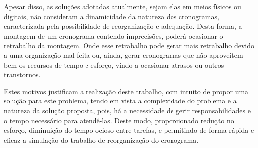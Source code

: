 \par Apesar disso, as soluções adotadas atualmente, sejam elas em meios físicos ou digitais, não consideram a dinamicidade da natureza dos cronogramas, caracterizada pela possibilidade de reorganização e adequação. Desta forma, a montagem de um cronograma contendo imprecisões, poderá ocasionar o retrabalho da montagem. Onde esse retrabalho pode gerar mais retrabalho devido a uma organização mal feita ou, ainda, gerar cronogramas que não aproveitem bem os recursos de tempo e esforço, vindo a ocasionar atrasos ou outros transtornos.
\par Estes motivos justificam a realização deste trabalho, com intuito de propor uma solução para este problema, tendo em vista a complexidade do problema e a natureza da solução proposta, pois, há a necessidade de gerir responsabilidades e o tempo necessário para atendê-las. Deste modo, proporcionado redução no esforço, diminuição do tempo ocioso entre tarefas, e permitindo de forma rápida e eficaz a simulação do trabalho de reorganização do cronograma.